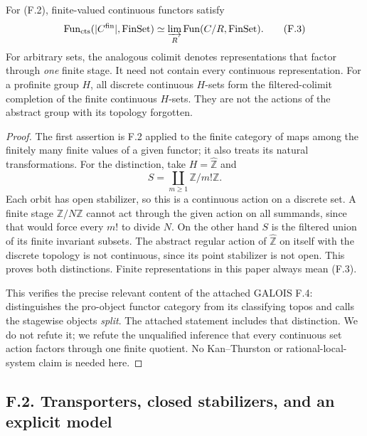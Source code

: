 For (F.2), finite-valued continuous functors satisfy
\[
 \operatorname{Fun}_{\mathrm{cts}}(|C^{\mathrm{fin}}|,\mathrm{FinSet})
   \simeq\varinjlim_R\operatorname{Fun}(C/R,\mathrm{FinSet}).                 \tag{F.3}
\]
For arbitrary sets, the analogous colimit denotes representations that factor through \emph{one} finite stage. It need not contain every continuous representation. For a profinite group $H$, all discrete continuous $H$-sets form the filtered-colimit completion of the finite continuous $H$-sets. They are not the actions of the abstract group with its topology forgotten.
\begin{proof}
The first assertion is F.2 applied to the finite category of maps among the finitely many finite values of a given functor; it also treats its natural transformations. For the distinction, take $H=\widehat{\mathbb Z}$ and
\[
 S=\coprod_{m\geq1}\mathbb Z/m!\mathbb Z.
\]
Each orbit has open stabilizer, so this is a continuous action on a discrete set. A finite stage $\mathbb Z/N\mathbb Z$ cannot act through the given action on all summands, since that would force every $m!$ to divide $N$. On the other hand $S$ is the filtered union of its finite invariant subsets. The abstract regular action of $\widehat{\mathbb Z}$ on itself with the discrete topology is not continuous, since its point stabilizer is not open. This proves both distinctions. Finite representations in this paper always mean (F.3).

This verifies the precise relevant content of the attached GALOIS F.4: \citet[notation preceding Definition 2.10, Theorem 3.13, and Corollary 3.20]{AF_Hoyois2018} distinguishes the pro-object functor category from its classifying topos and calls the stagewise objects \emph{split}. The attached statement includes that distinction. We do not refute it; we refute the unqualified inference that every continuous set action factors through one finite quotient. No Kan--Thurston or rational-local-system claim is needed here.
\end{proof}

\subsection{F.2. Transporters, closed stabilizers, and an explicit model}

